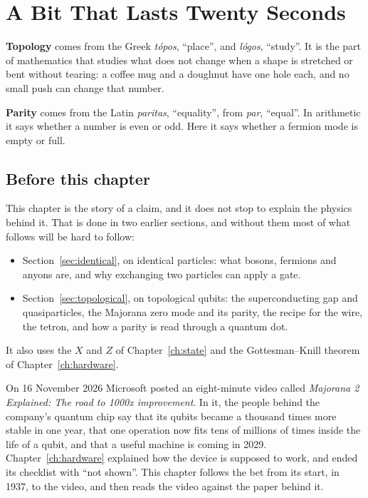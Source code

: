 \chapter{A Bit That Lasts Twenty Seconds}\label{ch:majorana}

\begin{etymology}
\textbf{Topology} comes from the Greek \emph{tópos}, ``place'', and \emph{lógos},
``study''. It is the part of mathematics that studies what does not change when a
shape is stretched or bent without tearing: a coffee mug and a doughnut have one
hole each, and no small push can change that number.

\textbf{Parity} comes from the Latin \emph{paritas}, ``equality'', from \emph{par},
``equal''. In arithmetic it says whether a number is even or odd. Here it says whether
a fermion mode is empty or full.
\end{etymology}

\section*{Before this chapter}

This chapter is the story of a claim, and it does not stop to explain the physics
behind it. That is done in two earlier sections, and without them most of what follows
will be hard to follow:

\begin{itemize}
\item Section~\ref{sec:identical}, on identical particles: what bosons, fermions and
anyons are, and why exchanging two particles can apply a gate.
\item Section~\ref{sec:topological}, on topological qubits: the superconducting gap and
quasiparticles, the Majorana zero mode and its parity, the recipe for the wire, the
tetron, and how a parity is read through a quantum dot.
\end{itemize}

It also uses the $X$ and $Z$ of Chapter~\ref{ch:state} and the Gottesman--Knill theorem
of Chapter~\ref{ch:hardware}.

\bigskip

On 16 November 2026 Microsoft posted an eight-minute video called \emph{Majorana 2
Explained: The road to 1000x improvement}. In it, the people behind the company's
quantum chip say that its qubits became a thousand times more stable in one year,
that one operation now fits tens of millions of times inside the life of a qubit,
and that a useful machine is coming in 2029. Chapter~\ref{ch:hardware} explained how
the device is supposed to work, and ended its checklist with ``not shown''. This
chapter follows the bet from its start, in 1937, to the video, and then reads the
video against the paper behind it.

